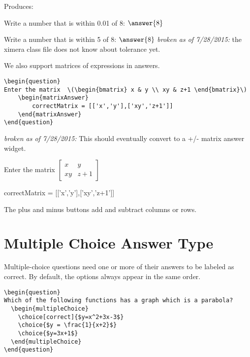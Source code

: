 \documentclass{ximera}
\begin{document}
Produces:

\begin{question}
  Write a number that is within 0.01 of 8: $\answer{8}$
\end{question}
\begin{question}
  Write a number that is within 5 of 8: $\answer{8}$  \emph{broken as of 7/28/2015:} the ximera class file does not know about tolerance yet.
\end{question}

We also support matrices of expressions in answers.

\begin{verbatim}
\begin{question}
Enter the matrix  \(\begin{bmatrix} x & y \\ xy & z+1 \end{bmatrix}\)
    \begin{matrixAnswer}
	    correctMatrix = [['x','y'],['xy','z+1']]
    \end{matrixAnswer}
\end{question}
\end{verbatim}

\emph{broken as of 7/28/2015:} This should eventually convert to a +/- matrix answer widget.

\begin{question}
Enter the matrix  \(\begin{bmatrix} x & y \\ xy & z+1 \end{bmatrix}\)
\begin{matrixAnswer}
    correctMatrix = [['x','y'],['xy','z+1']]
\end{matrixAnswer}
\end{question}

\begin{remark}
  The plus and minus buttons add and subtract columns or rows.  
\end{remark}


\section{Multiple Choice Answer Type}

Multiple-choice questions need one or more of their answers to be labeled as correct. By default, the options always appear in the same order.

\begin{verbatim}
\begin{question}
Which of the following functions has a graph which is a parabola?
  \begin{multipleChoice}
    \choice[correct]{$y=x^2+3x-3$}
    \choice{$y = \frac{1}{x+2}$}
    \choice{$y=3x+1$}
  \end{multipleChoice}
\end{question}
\end{verbatim}
\end{document}
